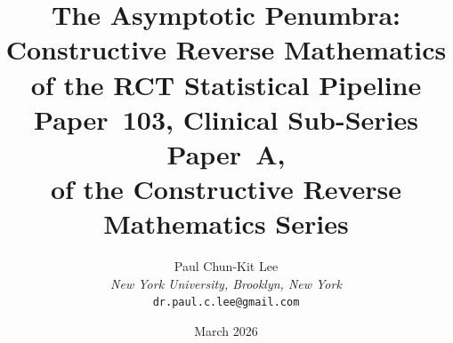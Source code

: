 \documentclass[11pt,a4paper]{article}
\theoremstyle{plain}
\theoremstyle{definition}
\begin{document}
\title{\textbf{The Asymptotic Penumbra:\\
Constructive Reverse Mathematics of the RCT Statistical Pipeline}\\[6pt]
\large Paper~103, Clinical Sub-Series Paper~A,\\
of the Constructive Reverse Mathematics Series}

\author{Paul Chun-Kit Lee\\
\textit{New York University, Brooklyn, New York}\\
\texttt{dr.paul.c.lee@gmail.com}}

\date{March 2026}
\maketitle

\end{document}

